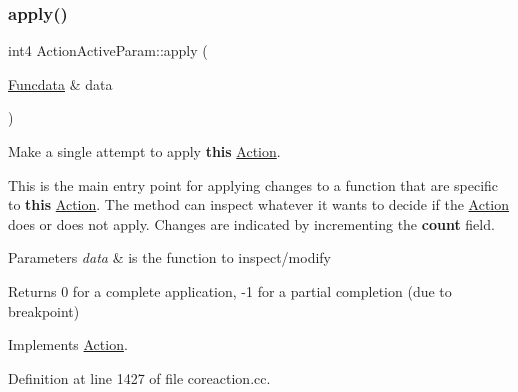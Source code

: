 \subsubsection{\texorpdfstring{apply()}{apply()}}
{\footnotesize\ttfamily int4 Action\+Active\+Param\+::apply (\begin{DoxyParamCaption}\item[{\mbox{\hyperlink{class_funcdata}{Funcdata}} \&}]{data }\end{DoxyParamCaption})\hspace{0.3cm}{\ttfamily [virtual]}}



Make a single attempt to apply {\bfseries{this}} \mbox{\hyperlink{class_action}{Action}}. 

This is the main entry point for applying changes to a function that are specific to {\bfseries{this}} \mbox{\hyperlink{class_action}{Action}}. The method can inspect whatever it wants to decide if the \mbox{\hyperlink{class_action}{Action}} does or does not apply. Changes are indicated by incrementing the {\bfseries{count}} field. 
\begin{DoxyParams}{Parameters}
{\em data} & is the function to inspect/modify \\
\hline
\end{DoxyParams}
\begin{DoxyReturn}{Returns}
0 for a complete application, -\/1 for a partial completion (due to breakpoint) 
\end{DoxyReturn}


Implements \mbox{\hyperlink{class_action_aac1c3999d6c685b15f5d9765a4d04173}{Action}}.



Definition at line 1427 of file coreaction.\+cc.

